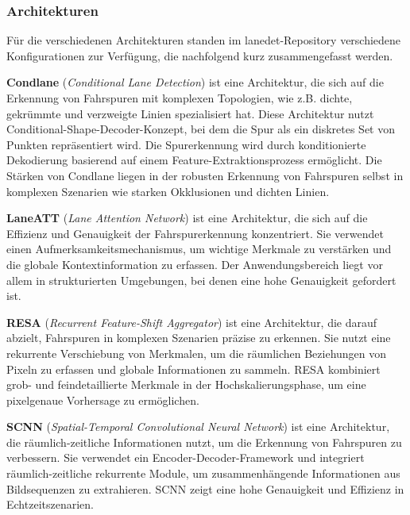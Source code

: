 \documentclass{article}
\begin{document}
                
            \subsubsection{Architekturen}
                Für die verschiedenen Architekturen standen im lanedet-Repository verschiedene Konfigurationen zur Verfügung, die nachfolgend kurz zusammengefasst werden.

                \textbf{Condlane} (\textit{Conditional Lane Detection}) ist eine Architektur, die sich auf die Erkennung von Fahrspuren mit komplexen Topologien, wie z.B. dichte, gekrümmte und verzweigte Linien spezialisiert hat. Diese Architektur nutzt Conditional-Shape-Decoder-Konzept, bei dem die Spur als ein diskretes Set von Punkten repräsentiert wird. Die Spurerkennung wird durch konditionierte Dekodierung basierend auf einem Feature-Extraktionsprozess ermöglicht. Die Stärken von Condlane liegen in der robusten Erkennung von Fahrspuren selbst in komplexen Szenarien wie starken Okklusionen und dichten Linien.
                \cite{Ganeriwala2023Cross}

                \textbf{LaneATT} (\textit{Lane Attention Network}) ist eine Architektur, die sich auf die Effizienz und Genauigkeit der Fahrspurerkennung konzentriert. Sie verwendet einen Aufmerksamkeitsmechanismus, um wichtige Merkmale zu verstärken und die globale Kontextinformation zu erfassen. Der Anwendungsbereich liegt vor allem in strukturierten Umgebungen, bei denen eine hohe Genauigkeit gefordert ist. 
                \cite{He2021Fast}

                \textbf{RESA} (\textit{Recurrent Feature-Shift Aggregator}) ist eine Architektur, die darauf abzielt, Fahrspuren in komplexen Szenarien präzise zu erkennen. Sie nutzt eine rekurrente Verschiebung von Merkmalen, um die räumlichen Beziehungen von Pixeln zu erfassen und globale Informationen zu sammeln. RESA kombiniert grob- und feindetaillierte Merkmale in der Hochskalierungsphase, um eine pixelgenaue Vorhersage zu ermöglichen.
                \cite{Zheng2020RESA}

                \textbf{SCNN} (\textit{Spatial-Temporal Convolutional Neural Network}) ist eine Architektur, die räumlich-zeitliche Informationen nutzt, um die Erkennung von Fahrspuren zu verbessern. Sie verwendet ein Encoder-Decoder-Framework und integriert räumlich-zeitliche rekurrente Module, um zusammenhängende Informationen aus Bildsequenzen zu extrahieren. SCNN zeigt eine hohe Genauigkeit und Effizienz in Echtzeitszenarien.
                \cite{Li2024Enhanced}
\end{document}
